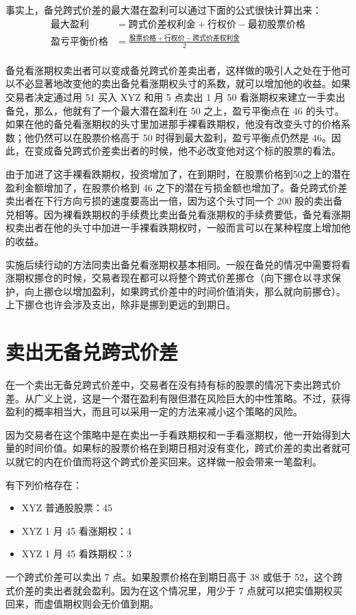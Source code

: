 事实上，备兑跨式价差的最大潜在盈利可以通过下面的公式很快计算出来：
\begin{equation}
    \begin{aligned}
        \text{最大盈利}   & =\text{跨式价差权利金}+\text{行权价}-\text{最初股票价格}         \\
        \text{盈亏平衡价格} & =\frac{\text{股票价格}+\text{行权价}-\text{跨式价差权利金}}{2} \\
    \end{aligned}
\end{equation}

备兑看涨期权卖出者可以变成备兑跨式价差卖出者，这样做的吸引人之处在于他可以不必显著地改变他的卖出备兑看涨期权头寸的系数，就可以增加他的收益。如果交易者决定通过用 51 买入 XYZ 和用 5 点卖出 1 月 50 看涨期权来建立一手卖出备兑，那么，他就有了一个最大潜在盈利在 50 之上，盈亏平衡点在 46 的头寸。如果在他的备兑看涨期权的头寸里加进那手裸看跌期权，他没有改变头寸的价格系数；他仍然可以在股票价格高于 50 时得到最大盈利，盈亏平衡点仍然是 46。因此，在变成备兑跨式价差卖出者的时候，他不必改变他对这个标的股票的看法。

由于加进了这手裸看跌期权，投资增加了，在到期时，在股票价格到50之上的潜在盈利金额增加了，在股票价格到 46 之下的潜在亏损金额也增加了。备兑跨式价差卖出者在下行方向亏损的速度要高出一倍，因为这个头寸同一个 200 股的卖出备兑相等。因为裸看跌期权的手续费比卖出备兑看涨期权的手续费要低，备兑看涨期权卖出者在他的头寸中加进一手裸看跌期权时，一般而言可以在某种程度上增加他的收益。

实施后续行动的方法同卖出备兑看涨期权基本相同。一般在备兑的情况中需要将看涨期权挪仓的时候，交易者现在都可以将整个跨式价差挪仓（向下挪仓以寻求保护，向上挪仓以增加盈利，如果跨式价差中的时间价值消失，那么就向前挪仓）。上下挪仓也许会涉及支出，除非是挪到更远的到期日。
\section{卖出无备兑跨式价差}
在一个卖出无备兑跨式价差中，交易者在没有持有标的股票的情况下卖出跨式价差。从广义上说，这是一个潜在盈利有限但潜在风险巨大的中性策略。不过，获得盈利的概率相当大，而且可以采用一定的方法来减小这个策略的风险。

因为交易者在这个策略中是在卖出一手看跌期权和一手看涨期权，他一开始得到大量的时间价值。如果标的股票价格在到期日相对没有变化，跨式价差的卖出者就可以就它的内在价值而将这个跨式价差买回来。这样做一般会带来一笔盈利。

\begin{tcolorbox}
    有下列价格存在：
    \begin{itemize}
        \item XYZ 普通股股票：45
        \item XYZ 1 月 45 看涨期权：4
        \item XYZ 1 月 45 看跌期权：3
    \end{itemize}
    一个跨式价差可以卖出 7 点。如果股票价格在到期日高于 38 或低于 52，这个跨式价差的卖出者就会盈利。因为在这个情况里，用少于 7 点就可以把实值期权买回来，而虚值期权则会无价值到期。
\end{tcolorbox}

